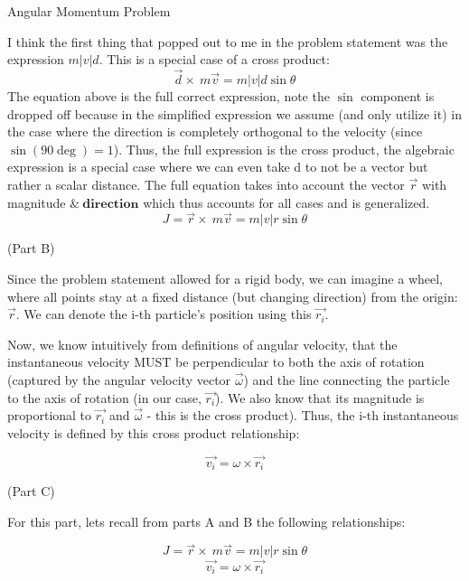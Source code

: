 \documentclass[12pt,letterpaper, onecolumn]{exam}
\begin{document}
\begin{questions}
    \question[Part A-D] Angular Momentum Problem\droppoints

    \begin{solution}
        I think the first thing that popped out to me in the problem statement was the expression $m|v|d$. This is a special case of a cross product:
        \begin{equation}
            \vec{d}\times\ m\vec{v}=m|v|d\sin{\theta}
        \end{equation}
        The equation above is the full correct expression, note the $\sin$ component is dropped off because in the simplified expression we assume (and only utilize it) in the case where the direction is completely orthogonal to the velocity (since $\sin{(90\deg)}=1$). Thus, the full expression is the cross product, the algebraic expression is a special case where we can even take d to not be a vector but rather a scalar distance. The full equation takes into account the vector $\vec{r}$ with magnitude $\&\ \textbf{direction}$ which thus accounts for all cases and is generalized.
        \begin{equation}
            J=\vec{r}\times\ m\vec{v}=m|v|r\sin{\theta}
        \end{equation}

        (Part B)

        Since the problem statement allowed for a rigid body, we can imagine a wheel, where all points stay at a fixed distance (but changing direction) from the origin: $\vec{r}$. We can denote the i-th particle's position using this $\vec{r_i}$.

        Now, we know intuitively from definitions of angular velocity, that the instantaneous velocity MUST be perpendicular to both the axis of rotation (captured by the angular velocity vector $\vec{\omega}$) and the line connecting the particle to the axis of rotation (in our case, $\vec{r_i}$). We also know that its magnitude is proportional to $\vec{r_i}$ and $\vec{\omega}$ - this is the cross product). Thus, the i-th instantaneous velocity is defined by this cross product relationship:

        \begin{equation}
            \vec{v_i} = \omega\times\vec{r_i}
        \end{equation}

        (Part C)

        For this part, lets recall from parts A and B the following relationships:

        \begin{equation}
            J=\vec{r}\times\ m\vec{v}=m|v|r\sin{\theta}
        \end{equation}
        \begin{equation}
            \vec{v_i} = \omega\times\vec{r_i}
        \end{equation}


\end{solution}
\end{questions}
\end{document}
